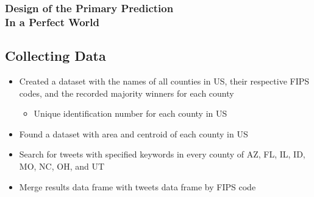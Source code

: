 \documentclass[xcolor=dvipsnames]{beamer}
\begin{document}

\begin{frame}
\frametitle{Design of the Primary Prediction \\ \small In a Perfect World}
\subsection{Collecting Data}
\begin{itemize}
	\item Created a dataset with the names of all counties in US, their respective FIPS codes, and the recorded majority winners for each county 
	\begin{itemize}
	\item Unique identification number for each county in US
	\end{itemize}
	\item Found a dataset with area and centroid of each county in US
	\item Search for tweets with specified keywords in every county of AZ, FL, IL, ID, MO, NC, OH, and UT
\begin{center}
	
\end{center}
	\item Merge results data frame with tweets data frame by FIPS code
	\end{itemize}
\end{frame}
\end{document}
